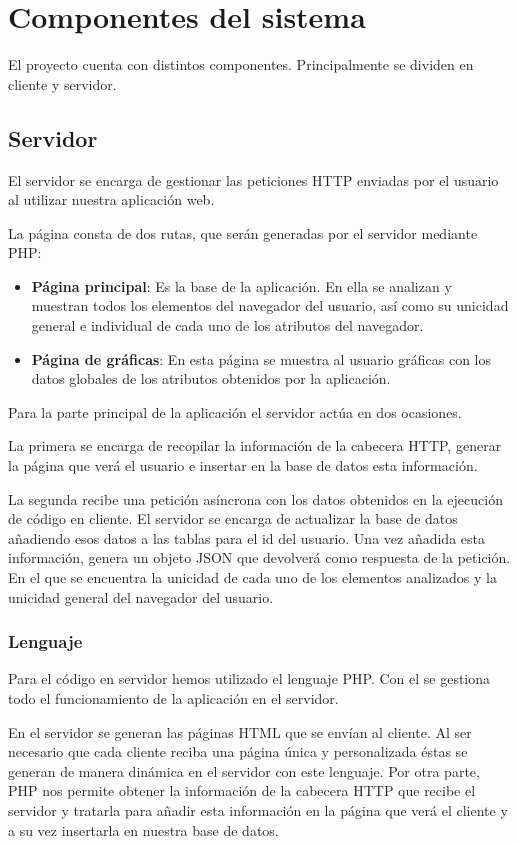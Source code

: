 \section{Componentes del sistema}
El proyecto cuenta con distintos componentes. Principalmente se dividen en cliente y servidor.
\subsection{Servidor}
El servidor se encarga de gestionar las peticiones HTTP enviadas por el usuario al utilizar nuestra aplicación web.\par
La página consta de dos rutas, que serán generadas por el servidor mediante PHP:
\begin{itemize}
    \item \textbf{Página principal}: Es la base de la aplicación. En ella se analizan y muestran todos los elementos del navegador del usuario, así como su unicidad general e individual de cada uno de los atributos del navegador.
    \item \textbf{Página de gráficas}: En esta página se muestra al usuario gráficas con los datos globales de los atributos obtenidos por la aplicación.
\end{itemize}
Para la parte principal de la aplicación el servidor actúa en dos ocasiones. \par
La primera se encarga de recopilar la información de la cabecera HTTP, generar la página que verá el usuario e insertar en la base de datos esta información.\par 
La segunda recibe una petición asíncrona con los datos obtenidos en la ejecución de código en cliente. El servidor se encarga de actualizar la base de datos añadiendo esos datos a las tablas para el id del usuario. Una vez añadida esta información, genera un objeto JSON que devolverá como respuesta de la petición. En el que se encuentra la unicidad de cada uno de los elementos analizados y la unicidad general del navegador del usuario.
\subsubsection{Lenguaje}
Para el código en servidor hemos utilizado el lenguaje PHP. Con el se gestiona todo el funcionamiento de la aplicación en el servidor.\par
En el servidor se generan las páginas HTML que se envían al cliente. Al ser necesario que cada cliente reciba una página única y personalizada éstas se generan de manera dinámica en el servidor con este lenguaje. Por otra parte, PHP nos permite obtener la información de la cabecera HTTP que recibe el servidor y tratarla para añadir esta información en la página que verá el cliente y a su vez insertarla en nuestra base de datos.\par
